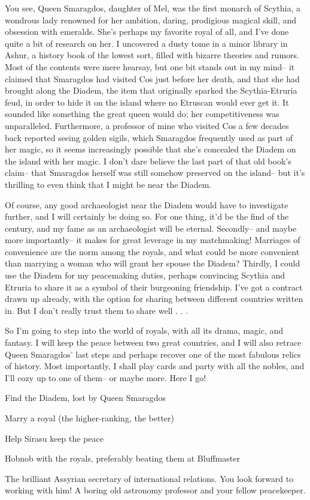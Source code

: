 \documentclass[char]{Kos}
\begin{document}
You see, Queen Smaragdos, daughter of Mel, was the first monarch of Scythia, a wondrous lady renowned for her ambition, daring, prodigious magical skill, and obsession with emeralds. She's perhaps my favorite royal of all, and I've done quite a bit of research on her. I uncovered a dusty tome in a minor library in Ashur, a history book of the lowest sort, filled with bizarre theories and rumors. Most of the contents were mere hearsay, but one bit stands out in my mind-- it claimed that Smaragdos had visited Cos just before her death, and that she had brought along the Diadem, the item that originally sparked the Scythia-Etruria feud, in order to hide it on the island where no Etruscan would ever get it. It sounded like something the great queen would do; her competitiveness was unparalleled. Furthermore, a professor of mine who visited Cos a few decades back reported seeing golden sigils, which Smaragdos frequently used as part of her magic, so it seems increasingly possible that she's concealed the Diadem on the island with her magic. I don't dare believe the last part of that old book's claim-- that Smaragdos herself was still somehow preserved on the island-- but it's thrilling to even think that I might be near the Diadem.

Of course, any good archaeologist near the Diadem would have to investigate further, and I will certainly be doing so. For one thing, it'd be the find of the century, and my fame as an archaeologist will be eternal. Secondly-- and maybe more importantly-- it makes for great leverage in my matchmaking! Marriages of convenience are the norm among the royals, and what could be more convenient than marrying a woman who will grant her spouse the Diadem? Thirdly, I could use the Diadem for my peacemaking duties, perhaps convincing Scythia and Etruria to share it as a symbol of their burgeoning friendship. I've got a contract drawn up already, with the option for sharing between different countries written in. But I don't really trust them to share well . . .

So I'm going to step into the world of royals, with all its drama, magic, and fantasy. I will keep the peace between two great countries, and I will also retrace Queen Smaragdos' last steps and perhaps recover one of the most fabulous relics of history. Most importantly, I shall play cards and party with all the nobles, and I'll cozy up to one of them-- or maybe more. Here I go!

\begin{itemz}[Goals]
\item Find the Diadem, lost by Queen Smaragdos
\item Marry a royal (the higher-ranking, the better)
\item Help Sirasu keep the peace
\item Hobnob with the royals, preferably beating them at Bluffmaster
\end{itemz}

\begin{contacts}
 The brilliant Assyrian secretary of international relations. You look forward to working with him!
\contact{\cAnarchist{}} A boring old astronomy professor and your fellow peacekeeper.
\end{contacts}
\end{document}
